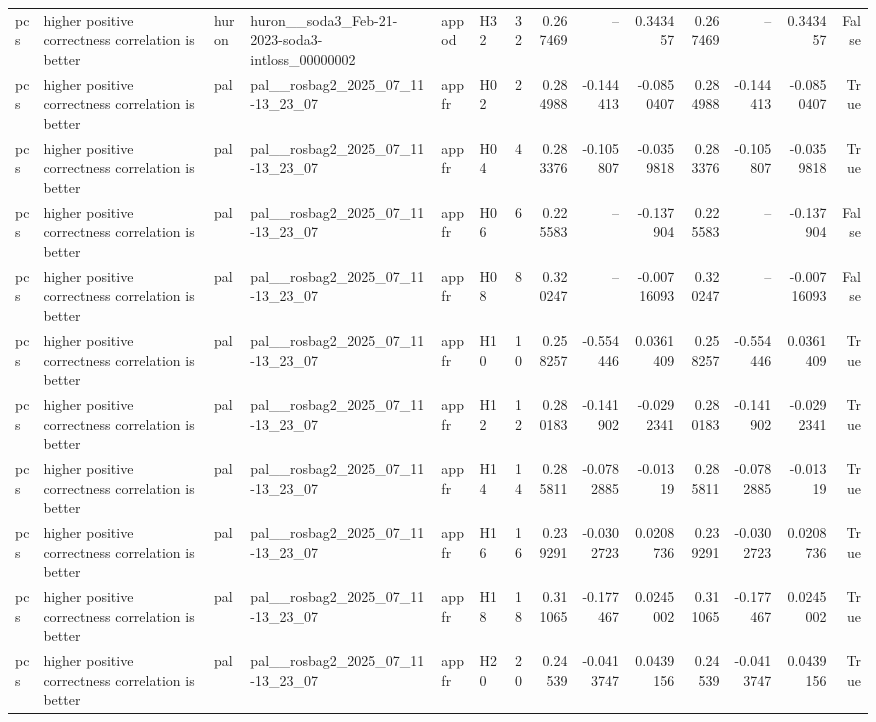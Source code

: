 \begin{longtable}{llllllrrrrrrrr}
pcs & higher positive correctness correlation is better & huron & huron\_\_soda3\_Feb-21-2023-soda3-intloss\_00000002 & appod & H32 & 32 & 0.267469 & -- & 0.343457 & 0.267469 & -- & 0.343457 & False \\
pcs & higher positive correctness correlation is better & pal & pal\_\_rosbag2\_2025\_07\_11-13\_23\_07 & appfr & H02 & 2 & 0.284988 & -0.144413 & -0.0850407 & 0.284988 & -0.144413 & -0.0850407 & True \\
pcs & higher positive correctness correlation is better & pal & pal\_\_rosbag2\_2025\_07\_11-13\_23\_07 & appfr & H04 & 4 & 0.283376 & -0.105807 & -0.0359818 & 0.283376 & -0.105807 & -0.0359818 & True \\
pcs & higher positive correctness correlation is better & pal & pal\_\_rosbag2\_2025\_07\_11-13\_23\_07 & appfr & H06 & 6 & 0.225583 & -- & -0.137904 & 0.225583 & -- & -0.137904 & False \\
pcs & higher positive correctness correlation is better & pal & pal\_\_rosbag2\_2025\_07\_11-13\_23\_07 & appfr & H08 & 8 & 0.320247 & -- & -0.00716093 & 0.320247 & -- & -0.00716093 & False \\
pcs & higher positive correctness correlation is better & pal & pal\_\_rosbag2\_2025\_07\_11-13\_23\_07 & appfr & H10 & 10 & 0.258257 & -0.554446 & 0.0361409 & 0.258257 & -0.554446 & 0.0361409 & True \\
pcs & higher positive correctness correlation is better & pal & pal\_\_rosbag2\_2025\_07\_11-13\_23\_07 & appfr & H12 & 12 & 0.280183 & -0.141902 & -0.0292341 & 0.280183 & -0.141902 & -0.0292341 & True \\
pcs & higher positive correctness correlation is better & pal & pal\_\_rosbag2\_2025\_07\_11-13\_23\_07 & appfr & H14 & 14 & 0.285811 & -0.0782885 & -0.01319 & 0.285811 & -0.0782885 & -0.01319 & True \\
pcs & higher positive correctness correlation is better & pal & pal\_\_rosbag2\_2025\_07\_11-13\_23\_07 & appfr & H16 & 16 & 0.239291 & -0.0302723 & 0.0208736 & 0.239291 & -0.0302723 & 0.0208736 & True \\
pcs & higher positive correctness correlation is better & pal & pal\_\_rosbag2\_2025\_07\_11-13\_23\_07 & appfr & H18 & 18 & 0.311065 & -0.177467 & 0.0245002 & 0.311065 & -0.177467 & 0.0245002 & True \\
pcs & higher positive correctness correlation is better & pal & pal\_\_rosbag2\_2025\_07\_11-13\_23\_07 & appfr & H20 & 20 & 0.24539 & -0.0413747 & 0.0439156 & 0.24539 & -0.0413747 & 0.0439156 & True \\

\end{longtable}

